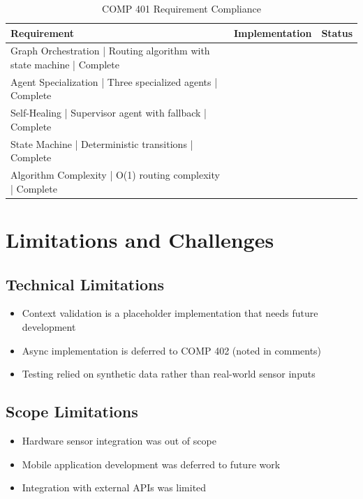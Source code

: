 \begin{table}[H]
\centering
\begin{tabular}{|l|l|l|}
\hline
\textbf{Requirement} & \textbf{Implementation} & \textbf{Status} \\
\hline
Graph Orchestration | Routing algorithm with state machine | Complete \\
Agent Specialization | Three specialized agents | Complete \\
Self-Healing | Supervisor agent with fallback | Complete \\
State Machine | Deterministic transitions | Complete \\
Algorithm Complexity | O(1) routing complexity | Complete \\
\hline
\end{tabular}
\caption{COMP 401 Requirement Compliance}
\end{table}

\section{Limitations and Challenges}

\subsection{Technical Limitations}

\begin{itemize}
    \item Context validation is a placeholder implementation that needs future development
    \item Async implementation is deferred to COMP 402 (noted in comments)
    \item Testing relied on synthetic data rather than real-world sensor inputs
\end{itemize}

\subsection{Scope Limitations}

\begin{itemize}
    \item Hardware sensor integration was out of scope
    \item Mobile application development was deferred to future work
    \item Integration with external APIs was limited
\end{itemize}

